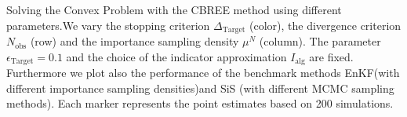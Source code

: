 Solving the Convex Problem with the CBREE method using  different parameters.We vary the stopping criterion $\Delta_{\text{Target}}$ (color), the divergence criterion $N_\text{obs}$ (row) and the importance sampling density $\mu^N$ (column). The parameter $\epsilon_{\text{Target}} = 0.1$ and the choice of the indicator approximation $I_\text{alg}$ are fixed. Furthermore we plot also the performance of the benchmark methods EnKF(with different importance sampling densities)and SiS (with different MCMC sampling methods). Each marker represents the point estimates based on 200 simulations.